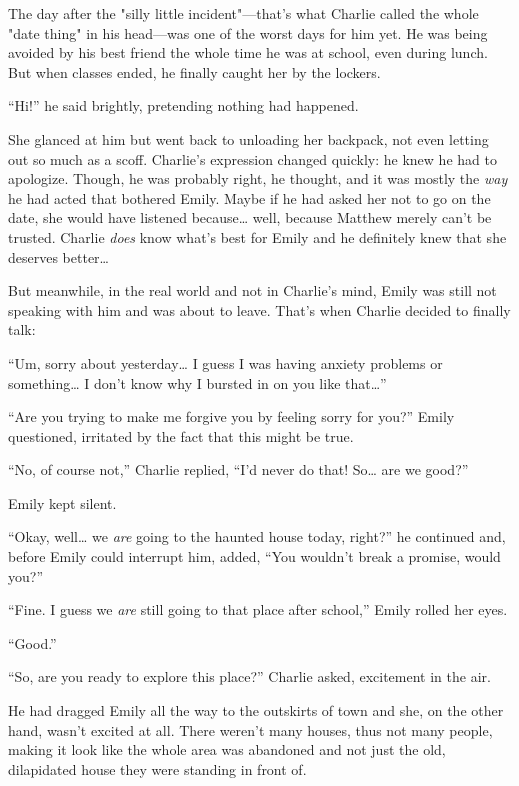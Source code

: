 The day after the "silly little incident"—that's what Charlie called the whole "date thing" in his head—was one of the worst days for him yet. He was being avoided by his best friend the whole time he was at school, even during lunch. But when classes ended, he finally caught her by the lockers.

“Hi!” he said brightly, pretending nothing had happened.

She glanced at him but went back to unloading her backpack, not even letting out so much as a scoff. Charlie's expression changed quickly: he knew he had to apologize. Though, he was probably right, he thought, and it was mostly the \textit{way} he had acted that bothered Emily. Maybe if he had asked her not to go on the date, she would have listened because… well, because Matthew merely can't be trusted. Charlie \textit{does} know what's best for Emily and he definitely knew that she deserves better…

But meanwhile, in the real world and not in Charlie's mind, Emily was still not speaking with him and was about to leave. That's when Charlie decided to finally talk:

“Um, sorry about yesterday… I guess I was having anxiety problems or something… I don't know why I bursted in on you like that…”

“Are you trying to make me forgive you by feeling sorry for you?” Emily questioned, irritated by the fact that this might be true.

“No, of course not,” Charlie replied, “I'd never do that! So… are we good?”

Emily kept silent.

“Okay, well… we \textit{are} going to the haunted house today, right?” he continued and, before Emily could interrupt him, added, “You wouldn't break a promise, would you?”

“Fine. I guess we \textit{are} still going to that place after school,” Emily rolled her eyes.

“Good.”

\bigskip

“So, are you ready to explore this place?” Charlie asked, excitement in the air.

He had dragged Emily all the way to the outskirts of town and she, on the other hand, wasn't excited at all. There weren't many houses, thus not many people, making it look like the whole area was abandoned and not just the old, dilapidated house they were standing in front of.

